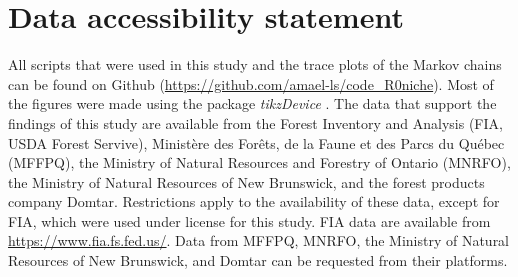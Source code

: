 \section{Data accessibility statement}
All scripts that were used in this study and the trace plots of the Markov chains can be found on Github (\url{https://github.com/amael-ls/code_R0niche}). Most of the figures were made using the package \textit{tikzDevice} \citep{tikzDevice}. The data that support the findings of this study are available from the Forest Inventory and Analysis (FIA, USDA Forest Servive), Ministère des Forêts, de la Faune et des Parcs du Québec (MFFPQ), the Ministry of Natural Resources and Forestry of Ontario (MNRFO), the Ministry of Natural Resources of New Brunswick, and the forest products company Domtar. Restrictions apply to the availability of these data, except for FIA, which were used under license for this study. FIA data are available from \url{https://www.fia.fs.fed.us/}. Data from MFFPQ, MNRFO, the Ministry of Natural Resources of New Brunswick, and Domtar can be requested from their platforms.
